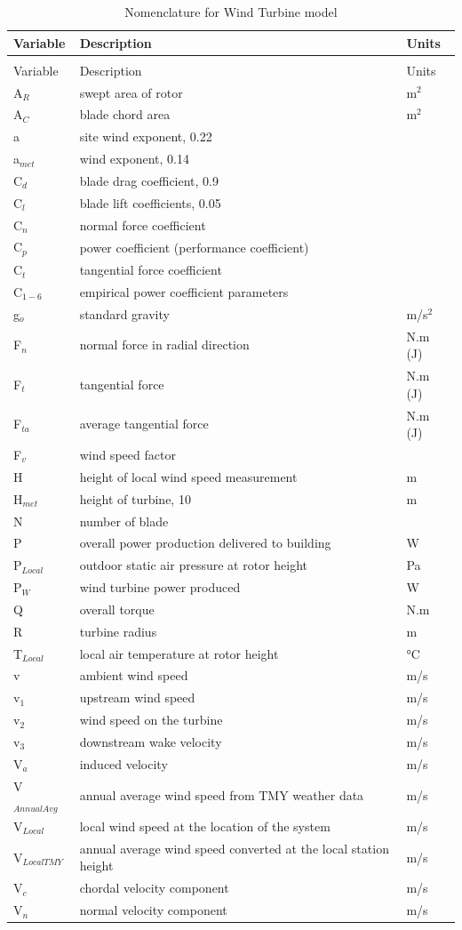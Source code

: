 \begin{longtable}[c]{p{1.2in}p{3.3in}p{1.5in}}
\caption{Nomenclature for Wind Turbine model \label{table:nomenclature-for-wind-turbine-model}} \tabularnewline
\toprule 
Variable & Description & Units \tabularnewline
\midrule
\endfirsthead

\caption[]{Nomenclature for Wind Turbine model} \tabularnewline
\toprule 
Variable & Description & Units \tabularnewline
\midrule
\endhead

A\(_{R}\) & swept area of rotor & m\(^{2}\) \tabularnewline
A\(_{C}\) & blade chord area & m\(^{2}\) \tabularnewline
a & site wind exponent, 0.22 & ~ \tabularnewline
a\(_{met}\) & wind exponent, 0.14 & ~ \tabularnewline
C\(_{d}\) & blade drag coefficient, 0.9 & ~ \tabularnewline
C\(_{l}\) & blade lift coefficients, 0.05 & ~ \tabularnewline
C\(_{n}\) & normal force coefficient & ~ \tabularnewline
C\(_{p}\) & power coefficient (performance coefficient) & ~ \tabularnewline
C\(_{t}\) & tangential force coefficient & ~ \tabularnewline
C\(_{1-6}\) & empirical power coefficient parameters & ~ \tabularnewline
g\(_{o}\) & standard gravity & m/s\(^{2}\) \tabularnewline
F\(_{n}\) & normal force in radial direction & N.m (J) \tabularnewline
F\(_{t}\) & tangential force & N.m (J) \tabularnewline
F\(_{ta}\) & average tangential force & N.m (J) \tabularnewline
F\(_{v}\) & wind speed factor & ~ \tabularnewline
H & height of local wind speed measurement & m \tabularnewline
H\(_{met}\) & height of turbine, 10 & m \tabularnewline
N & number of blade & ~ \tabularnewline
P & overall power production delivered to building~ & W \tabularnewline
P\(_{Local}\) & outdoor static air pressure at rotor height & Pa \tabularnewline
P\(_{W}\) & wind turbine power produced & W \tabularnewline
Q & overall torque & N.m \tabularnewline
R & turbine radius & m \tabularnewline
T\(_{Local}\) & local air temperature at rotor height & °C \tabularnewline
v & ambient wind speed & m/s \tabularnewline
v\(_{1}\) & upstream wind speed & m/s \tabularnewline
v\(_{2}\) & wind speed on the turbine & m/s \tabularnewline
v\(_{3}\) & downstream wake velocity & m/s \tabularnewline
V\(_{a}\) & induced velocity & m/s \tabularnewline
V\(_{AnnualAvg}\) & annual average wind speed from TMY weather data & m/s \tabularnewline
V\(_{Local}\) & local wind speed at the location of the system & m/s \tabularnewline
V\(_{LocalTMY}\) & annual average wind speed converted at the local station height & m/s \tabularnewline
V\(_{c}\) & chordal velocity component & m/s \tabularnewline
V\(_{n}\) & normal velocity component & m/s \tabularnewline

\end{longtable}
